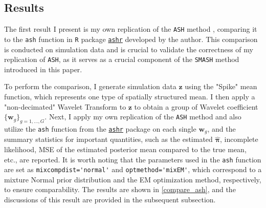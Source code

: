 \documentclass[11pt]{article}
\begin{document}
\subsection{Results}
The first result I present is my own replication of the \verb|ASH| method \cite{Stephens}, comparing it to the \verb|ash| function in \verb|R| package \href{https://cran.r-project.org/web/packages/ashr/ashr.pdf}{\texttt{ashr}} developed by the author. This comparison is conducted on simulation data and is crucial to validate the correctness of my replication of \verb|ASH|, as it serves as a crucial component of the \verb|SMASH| method \cite{Xing} introduced in this paper.

To perform the comparison, I generate simulation data $\boldsymbol{z}$ using the "Spike" mean function, which represents one type of spatially structured mean. I then apply a "non-decimated" Wavelet Transform to $\boldsymbol{z}$ to obtain a group of Wavelet coefficient $\{\boldsymbol{w}_g\}_{g=1, \ldots, G}$. Next, I apply my own replication of the \verb|ASH| method and also utilize the \verb|ash| function from the \href{https://cran.r-project.org/web/packages/ashr/ashr.pdf}{\texttt{ashr}} package on each single $\boldsymbol{w}_g$, and the summary statistics for important quantities, such as the estimated $\hat{\boldsymbol{\pi}}$, incomplete likelihood, MSE of the estimated posterior mean compared to the true mean, etc., are reported. It is worth noting that the parameters used in the \verb|ash| function are set as \verb|mixcompdist='normal'| and \verb|optmethod='mixEM'|, which correspond to a mixture Normal prior distribution and the EM optimization method, respectively, to ensure comparability. The results are shown in \autoref{compare_ash}, and the discussions of this result are provided in the subsequent subsection.

\end{document}
